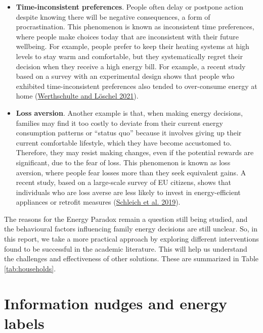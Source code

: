 \documentclass[
  11pt,
  captions=heading]{scrreport}
\begin{document}
\begin{itemize}
\item
  \textbf{Time-inconsistent preferences}. People often delay or postpone
  action despite knowing there will be negative consequences, a form of
  procrastination. This phenomenon is known as inconsistent time
  preferences, where people make choices today that are inconsistent
  with their future wellbeing. For example, people prefer to keep their
  heating systems at high levels to stay warm and comfortable, but they
  systematically regret their decision when they receive a high energy
  bill. For example, a recent study based on a survey with an
  experimental design shows that people who exhibited time-inconsistent
  preferences also tended to over-consume energy at home
  (\protect\hyperlink{ref-werthschulte2021role}{Werthschulte and Löschel
  2021}).
\item
  \textbf{Loss aversion}. Another example is that, when making energy
  decisions, families may find it too costly to deviate from their
  current energy consumption patterns or ``status quo'' because it
  involves giving up their current comfortable lifestyle, which they
  have become accustomed to. Therefore, they may resist making changes,
  even if the potential rewards are significant, due to the fear of
  loss. This phenomenon is known as loss aversion, where people fear
  losses more than they seek equivalent gains. A recent study, based on
  a large-scale survey of EU citizens, shows that individuals who are
  loss averse are less likely to invest in energy-efficient appliances
  or retrofit measures
  (\protect\hyperlink{ref-schleich2019large}{Schleich et al. 2019}).
\end{itemize}

The reasons for the Energy Paradox remain a question still being
studied, and the behavioural factors influencing family energy decisions
are still unclear. So, in this report, we take a more practical approach
by exploring different interventions found to be successful in the
academic literature. This will help us understand the challenges and
effectiveness of other solutions. These are summarized in Table
\ref{tab:households}.

\hypertarget{information-nudges-and-energy-labels}{%
\section{Information nudges and energy
labels}\label{information-nudges-and-energy-labels}}
\end{document}
